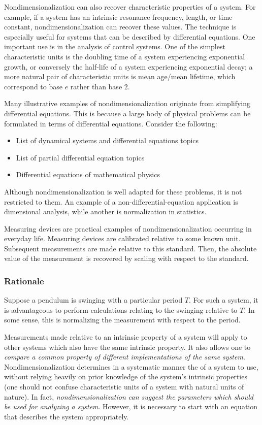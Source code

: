 Nondimensionalization can also recover characteristic properties of a system. For example, if a system has an intrinsic resonance frequency, length, or time constant, nondimensionalization can recover these values. The technique is especially useful for systems that can be described by differential equations. One important use is in the analysis of control systems. One of the simplest characteristic units is the doubling time of a system experiencing exponential growth, or conversely the half-life of a system experiencing exponential decay; a more natural pair of characteristic units is mean age/mean lifetime, which correspond to base $e$ rather than base 2.

Many illustrative examples of nondimensionalization originate from simplifying differential equations. This is because a large body of physical problems can be formulated in terms of differential equations. Consider the following:
\begin{itemize}
\item List of dynamical systems and differential equations topics
\item List of partial differential equation topics
\item Differential equations of mathematical physics
\end{itemize}

Although nondimensionalization is well adapted for these problems, it is not restricted to them. An example of a non-differential-equation application is dimensional analysis, while another is normalization in statistics.

Measuring devices are practical examples of nondimensionalization occurring in everyday life. Measuring devices are calibrated relative to some known unit. Subsequent measurements are made relative to this standard. Then, the absolute value of the measurement is recovered by scaling with respect to the standard.


\subsubsection{Rationale}
Suppose a pendulum is swinging with a particular period $T$. For such a system, it is advantageous to perform calculations relating to the swinging relative to $T$. In some sense, this is normalizing the measurement with respect to the period.

Measurements made relative to an intrinsic property of a system will apply to other systems which also have the same intrinsic property. It also allows one to \emph{compare a common property of different implementations of the same system}. Nondimensionalization determines in a systematic manner the  of a system to use, without relying heavily on prior knowledge of the system's intrinsic properties (one should not confuse characteristic units of a system with natural units of nature). In fact, \emph{nondimensionalization can suggest the parameters which should be used for analyzing a system}. However, it is necessary to start with an equation that describes the system appropriately.


